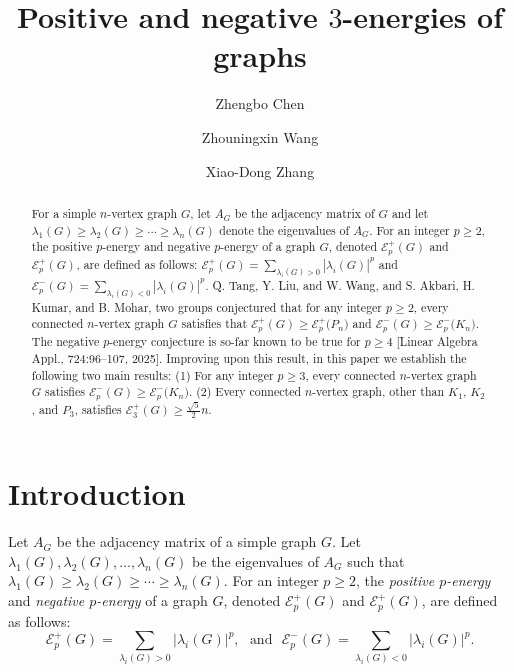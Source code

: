 \documentclass[a4paper,12pt]{article}
\theoremstyle{plain}
\begin{document}
\title{Positive and negative $3$-energies of graphs}
    \author[1]{Zhengbo Chen}
    \author[2]{Zhouningxin Wang}
    \author[3]{Xiao-Dong Zhang}



\date{ }	
\maketitle


\begin{abstract}
For a simple $n$-vertex graph $G$, let $A_G$ be the adjacency matrix of $G$ and let $\lambda_{1}(G) \geq \lambda_{2}(G)\geq  \cdots \geq \lambda_{n}(G)$ denote the eigenvalues of $A_G$. For an integer $p\geq 2$, the positive $p$-energy and negative $p$-energy of a graph $G$, denoted $\mathcal{E}^+_p(G)$ and $\mathcal{E}^+_p(G)$, are defined as follows: $\mathcal{E}^+_p(G)=\sum_{\lambda_{i}(G)>0} |\lambda_{i}(G)|^{p}$ and $\mathcal{E}^-_p(G)=\sum_{\lambda_{i}(G)<0}|\lambda_{i}(G)|^{p}$. Q. Tang, Y. Liu, and W. Wang, and S. Akbari, H. Kumar, and B. Mohar, two groups conjectured that for any integer $p\geq 2$, every connected $n$-vertex graph $G$ satisfies that $\mathcal{E}^+_p({G}) \geq \mathcal{E}^+_p({P_{n})}$ and $\mathcal{E}^-_p({G}) \geq \mathcal{E}^-_p({K_{n})}$. The negative $p$-energy conjecture is so-far known to be true for $p \geq 4$ [Linear Algebra Appl., 724:96–107, 2025]. Improving upon this result, in this paper we establish the following two main results: 
(1) For any integer $p\geq 3$, every connected $n$-vertex graph $G$ satisfies $\mathcal{E}^-_p({G}) \geq \mathcal{E}^-_p({K_{n})}$. 
(2) Every connected $n$-vertex graph, other than $K_1$, $K_2$, and $P_3$, satisfies $\mathcal{E}_3^{+}(G)\geq\frac{\sqrt{5}}{2}n$.
\end{abstract}

\maketitle


\section{Introduction}
Let $A_G$ be the adjacency matrix of a simple graph $G$. Let $\lambda_{1}(G), \lambda_{2}(G), \ldots, \lambda_{n}(G)$ be the eigenvalues of $A_G$ such that $\lambda_{1}(G) \geq \lambda_{2}(G)\geq  \cdots \geq \lambda_{n}(G)$. 
For an integer $p\geq 2$, the \emph{positive $p$-energy} and \emph{negative $p$-energy} of a graph $G$, denoted $\mathcal{E}^+_p(G)$ and $\mathcal{E}^+_p(G)$, are defined as follows: 
$$\mathcal{E}^+_p(G)=\sum_{\lambda_{i}(G)>0} |\lambda_{i}(G)|^{p},~~~\text{and}~~~
\mathcal{E}^-_p(G)=\sum_{\lambda_{i}(G)<0}|\lambda_{i}(G)|^{p}.$$
\end{document}
